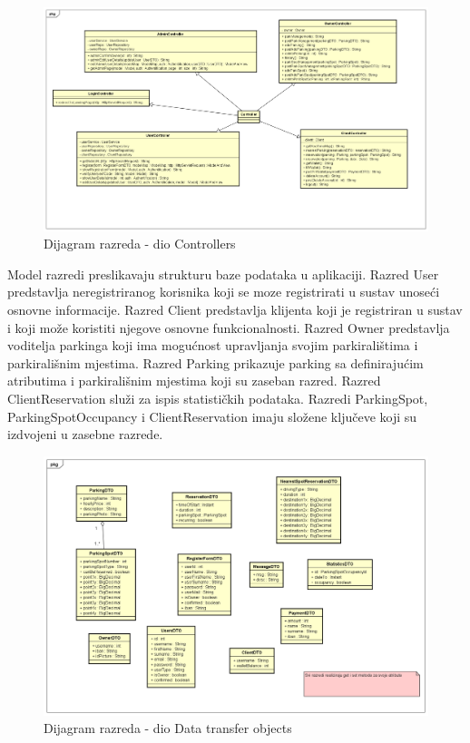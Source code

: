 \begin{figure}[H]
	
	\includegraphics[width=\textwidth]{slike/controller.png} %
	\centering
	\caption{Dijagram razreda - dio Controllers}
	\label{fig:controllers}
\end{figure}

Model razredi preslikavaju strukturu baze podataka u aplikaciji. Razred User predstavlja neregistriranog korisnika koji se moze registrirati u sustav unoseći osnovne informacije. Razred Client predstavlja klijenta koji je registriran u sustav i koji može koristiti njegove osnovne funkcionalnosti. Razred Owner predstavlja voditelja parkinga koji ima mogućnost upravljanja svojim parkiralištima i parkirališnim mjestima. Razred Parking prikazuje parking sa definirajućim atributima i parkirališnim mjestima koji su zaseban razred. Razred ClientReservation služi za ispis statističkih podataka. Razredi ParkingSpot, ParkingSpotOccupancy i ClientReservation imaju složene ključeve koji su izdvojeni u zasebne razrede.

\begin{figure}[H]
	
	\includegraphics[width=\textwidth]{slike/dto.png} %
	\centering
	\caption{Dijagram razreda - dio Data transfer objects}
	\label{fig:dto}
\end{figure}

